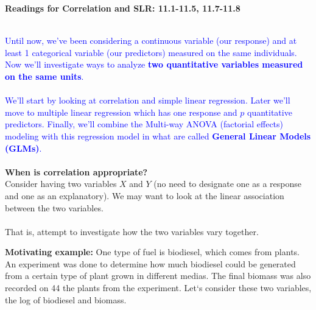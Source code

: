 \begin{center}\large\textbf{Readings for Correlation and SLR: 11.1-11.5, 11.7-11.8}\\ %
\normalsize \end{center}
\large ~\hrulefill
~\\
\textcolor{blue}{Until now, we've been considering a continuous variable (our response) and at least 1 categorical variable (our predictors) measured on the same individuals.  Now we'll investigate ways to analyze \textbf{two quantitative variables measured on the same units}.\\~\\
We'll start by looking at correlation and simple linear regression.  Later we'll move to multiple linear regression which has one response and $p$ quantitative predictors.  Finally, we'll combine the Multi-way ANOVA (factorial effects) modeling with this regression model in what are called \textbf{General Linear Models (GLMs)}.}\\~\\

\textbf{When is correlation appropriate?}\\
Consider having two variables $X$ and $Y$ (no need to designate one as a response and one as an explanatory).  We may want to look at the linear association between the two variables.\\~\\

That is, attempt to investigate how the two variables vary together.

\newpage

\textbf{Motivating example:} One type of fuel is biodiesel, which comes from plants.  An experiment was done to determine how much biodiesel could be generated from a certain type of plant grown in different medias.  The final biomass was also recorded on 44 the plants from the experiment.  Let`s consider these two variables, the log of biodiesel and biomass.  \\

